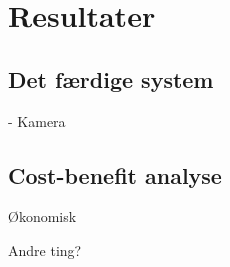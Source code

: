 \chapter{Resultater}

\section{Det færdige system}
- Kamera

\section{Cost-benefit analyse}
Økonomisk

Andre ting?